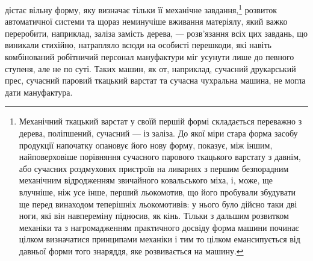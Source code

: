 дістає вільну форму, яку визначає тільки її механічне завдання,\footnote{
Механічний ткацький варстат у своїй першій формі складається
переважно з дерева, поліпшений, сучасний — із заліза. До якої міри стара
форма засобу продукції напочатку опановує його нову форму, показує,
між іншим, найповерховіше порівняння сучасного парового ткацького
варстату з давнім, або сучасних роздмухових пристроїв на ливарнях
з першим безпорадним механічним відродженням звичайного ковальського
міха, і, може, ще влучніше, ніж усе інше, перший льокомотив, що його
пробували збудувати ще перед винаходом теперішніх льокомотивів: у
нього було дійсно таки дві ноги, які він навпереміну підносив, як кінь.
Тільки з дальшим розвитком механіки та з нагромадженням практичного
досвіду форма машини починає цілком визначатися принципами механіки
і тим то цілком емансипується від давньої форми того знаряддя, яке розвивається
на машину.
}
розвиток автоматичної системи та щораз неминучіше вживання
матеріялу, який важко переробити, наприклад, заліза замість
дерева, — розв’язання всіх цих завдань, що виникали стихійно,
натрапляло всюди на особисті перешкоди, які навіть комбінований
робітничий персонал мануфактури міг усунути лише
до певного ступеня, але не по суті. Таких машин, як от, наприклад,
сучасний друкарський прес, сучасний паровий ткацький
варстат та сучасна чухральна машина, не могла дати
мануфактура.

